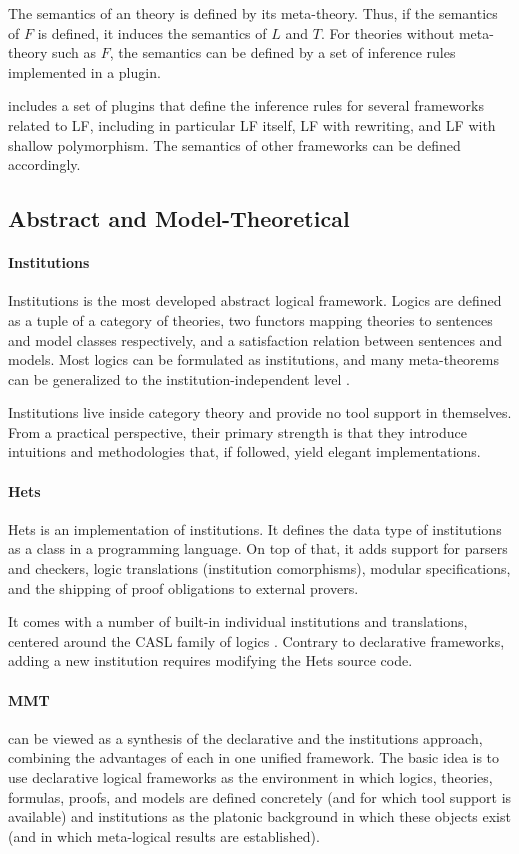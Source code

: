 \documentclass[12pt]{article}
\newcommand{\system}[2][]{\paragraph{#2}#2 \ifnonempty[\cite{#2}]{#1}{\cite{#1}}}
\begin{document}
The semantics of an \mmt theory is defined by its meta-theory.
Thus, if the semantics of $F$ is defined, it induces the semantics of $L$ and $T$.
For theories without meta-theory such as $F$, the semantics can be defined by a set of inference rules implemented in a plugin.

\mmt includes a set of plugins that define the inference rules for several frameworks related to LF, including in particular LF itself, LF with rewriting, and LF with shallow polymorphism.
The semantics of other frameworks can be defined accordingly.

\subsection{Abstract and Model-Theoretical}

\system{Institutions} is the most developed abstract logical framework.
Logics are defined as a tuple of a category of theories, two functors mapping theories to sentences and model classes respectively, and a satisfaction relation between sentences and models.
Most logics can be formulated as institutions, and many meta-theorems can be generalized to the institution-independent level \cite{institutionindependent}.

Institutions live inside category theory and provide no tool support in themselves.
From a practical perspective, their primary strength is that they introduce intuitions and methodologies that, if followed, yield elegant implementations.

\system{Hets} is an implementation of institutions.
It defines the data type of institutions as a class in a programming language.
On top of that, it adds support for parsers and checkers, logic translations (institution comorphisms), modular specifications, and the shipping of proof obligations to external provers.

It comes with a number of built-in individual institutions and translations, centered around the CASL family of logics \cite{caslmanual}.
Contrary to declarative frameworks, adding a new institution requires modifying the Hets source code.

\paragraph{MMT}
\cite{rabe:howto:14,rabe:combining:10} can be viewed as a synthesis of the declarative and the institutions approach, combining the advantages of each in one unified framework.
The basic idea is to use declarative logical frameworks as the environment in which logics, theories, formulas, proofs, and models are defined concretely (and for which tool support is available) and institutions as the platonic background in which these objects exist (and in which meta-logical results are established).
\end{document}
